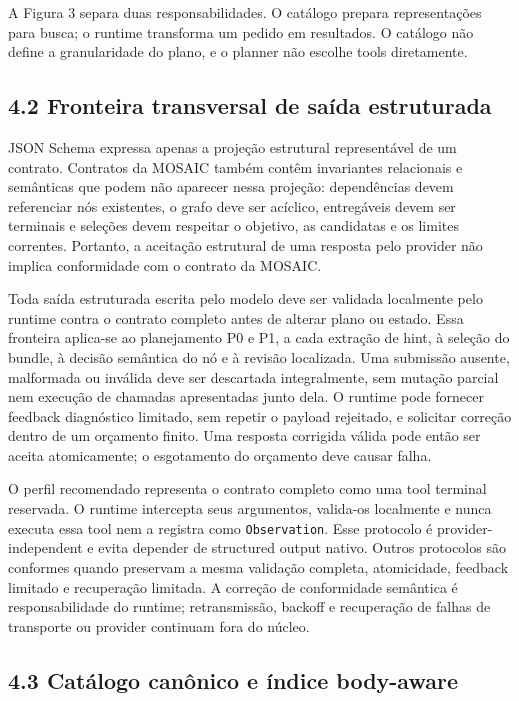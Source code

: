 \documentclass[12pt,a4paper]{article}
\begin{document}


A Figura 3 separa duas responsabilidades. O catálogo prepara representações para busca; o runtime transforma um pedido em resultados. O catálogo não define a granularidade do plano, e o planner não escolhe tools diretamente.



\subsection*{4.2 Fronteira transversal de saída estruturada}

JSON Schema expressa apenas a projeção estrutural representável de um contrato. Contratos da MOSAIC também contêm invariantes relacionais e semânticas que podem não aparecer nessa projeção: dependências devem referenciar nós existentes, o grafo deve ser acíclico, entregáveis devem ser terminais e seleções devem respeitar o objetivo, as candidatas e os limites correntes. Portanto, a aceitação estrutural de uma resposta pelo provider não implica conformidade com o contrato da MOSAIC.

Toda saída estruturada escrita pelo modelo deve ser validada localmente pelo runtime contra o contrato completo antes de alterar plano ou estado. Essa fronteira aplica-se ao planejamento P0 e P1, a cada extração de hint, à seleção do bundle, à decisão semântica do nó e à revisão localizada. Uma submissão ausente, malformada ou inválida deve ser descartada integralmente, sem mutação parcial nem execução de chamadas apresentadas junto dela. O runtime pode fornecer feedback diagnóstico limitado, sem repetir o payload rejeitado, e solicitar correção dentro de um orçamento finito. Uma resposta corrigida válida pode então ser aceita atomicamente; o esgotamento do orçamento deve causar falha.

O perfil recomendado representa o contrato completo como uma tool terminal reservada. O runtime intercepta seus argumentos, valida-os localmente e nunca executa essa tool nem a registra como \texttt{Observation}. Esse protocolo é provider-independent e evita depender de structured output nativo. Outros protocolos são conformes quando preservam a mesma validação completa, atomicidade, feedback limitado e recuperação limitada. A correção de conformidade semântica é responsabilidade do runtime; retransmissão, backoff e recuperação de falhas de transporte ou provider continuam fora do núcleo.

\subsection*{4.3 Catálogo canônico e índice body-aware}
\end{document}
